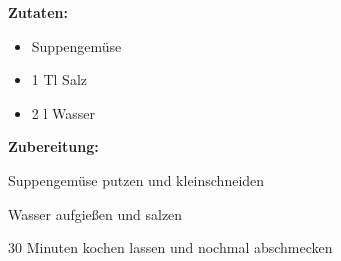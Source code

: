 

\textbf {Zutaten:} \\
\begin{itemize}
	\item Suppengemüse
	\item 1 Tl Salz
	\item 2 l Wasser
\end{itemize}

\vspace* {2cm}

\textbf {Zubereitung:} \\
\begin{compactenum}
	\item Suppengemüse putzen und kleinschneiden
	\item Wasser aufgießen und salzen
	\item 30 Minuten kochen lassen und nochmal abschmecken
\end{compactenum}



